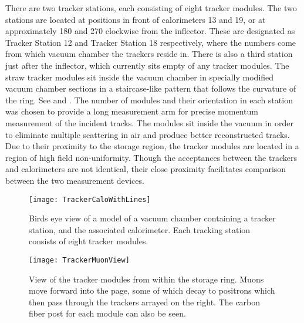 There are two tracker stations, each consisting of eight tracker modules. The two stations are located at positions in front of calorimeters 13 and 19, or at approximately 180\textdegree{} and 270\textdegree{} clockwise from the inflector. These are designated as Tracker Station 12 and Tracker Station 18 respectively, where the numbers come from which vacuum chamber the trackers reside in. There is also a third station just after the inflector, which currently sits empty of any tracker modules. The straw tracker modules sit inside the vacuum chamber in specially modified vacuum chamber sections in a staircase-like pattern that follows the curvature of the ring. See  and . The number of modules and their orientation in each station was chosen to provide a long measurement arm for precise momentum measurement of the incident tracks. The modules sit inside the vacuum in order to eliminate multiple scattering in air and produce better reconstructed tracks. Due to their proximity to the storage region, the tracker modules are located in a region of high field non-uniformity. Though the acceptances between the trackers and calorimeters are not identical, their close proximity facilitates comparison between the two measurement devices. 




\begin{figure}
    \centering
    \texttt{[image: TrackerCaloWithLines]}
    \caption[Model view of tracker station]{Birds eye view of a model of a vacuum chamber containing a tracker station, and the associated calorimeter. Each tracking station consists of eight tracker modules.}
    \label{fig:TrackerCaloWithLines}
\end{figure}

\begin{figure}
    \centering
    \texttt{[image: TrackerMuonView]}
    \caption[Muon perspective view of tracker station]{View of the tracker modules from within the storage ring. Muons move forward into the page, some of which decay to positrons which then pass through the trackers arrayed on the right. The carbon fiber post for each module can also be seen.}
    \label{fig:TrackerMuonView}
\end{figure}



